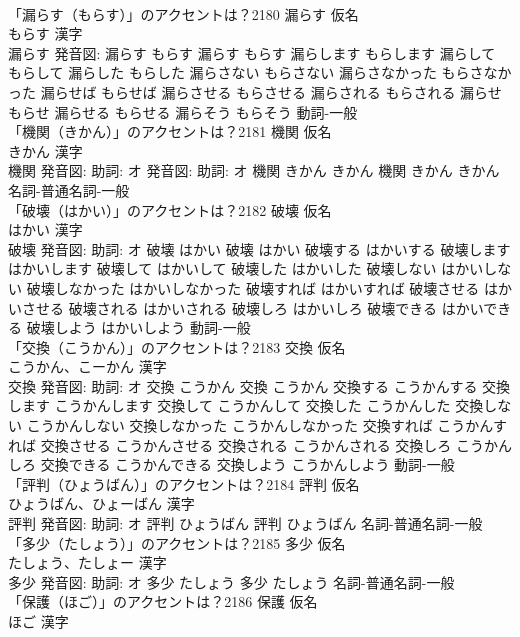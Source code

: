 \documentclass[8pt]{extreport}
\begin{document}
\begin{CJK}{UTF8}{min}
\\	「漏らす（もらす）」のアクセントは？2180	漏らす 仮名　
\\	もらす 漢字　
\\	漏らす 発音図:	漏らす もらす		漏らす もらす 漏らします もらします 漏らして もらして 漏らした もらした 漏らさない もらさない 漏らさなかった もらさなかった 漏らせば もらせば 漏らさせる もらさせる 漏らされる もらされる 漏らせ もらせ 漏らせる もらせる 漏らそう もらそう				動詞-一般 
\\	「機関（きかん）」のアクセントは？2181	機関 仮名　
\\	きかん 漢字　
\\	機関 発音図: 助詞: オ 発音図: 助詞: オ	機関 きかん きかん		機関 きかん きかん				名詞-普通名詞-一般 
\\	「破壊（はかい）」のアクセントは？2182	破壊 仮名　
\\	はかい 漢字　
\\	破壊 発音図: 助詞: オ	破壊 はかい		破壊 はかい 破壊する はかいする 破壊します はかいします 破壊して はかいして 破壊した はかいした 破壊しない はかいしない 破壊しなかった はかいしなかった 破壊すれば はかいすれば 破壊させる はかいさせる 破壊される はかいされる 破壊しろ はかいしろ 破壊できる はかいできる 破壊しよう はかいしよう				動詞-一般 
\\	「交換（こうかん）」のアクセントは？2183	交換 仮名　
\\	こうかん、こーかん 漢字　
\\	交換 発音図: 助詞: オ	交換 こうかん		交換 こうかん 交換する こうかんする 交換します こうかんします 交換して こうかんして 交換した こうかんした 交換しない こうかんしない 交換しなかった こうかんしなかった 交換すれば こうかんすれば 交換させる こうかんさせる 交換される こうかんされる 交換しろ こうかんしろ 交換できる こうかんできる 交換しよう こうかんしよう				動詞-一般 
\\	「評判（ひょうばん）」のアクセントは？2184	評判 仮名　
\\	ひょうばん、ひょーばん 漢字　
\\	評判 発音図: 助詞: オ	評判 ひょうばん		評判 ひょうばん				名詞-普通名詞-一般 
\\	「多少（たしょう）」のアクセントは？2185	多少 仮名　
\\	たしょう、たしょー 漢字　
\\	多少 発音図: 助詞: オ	多少 たしょう		多少 たしょう				名詞-普通名詞-一般 
\\	「保護（ほご）」のアクセントは？2186	保護 仮名　
\\	ほご 漢字　

\end{CJK}
\end{document}
